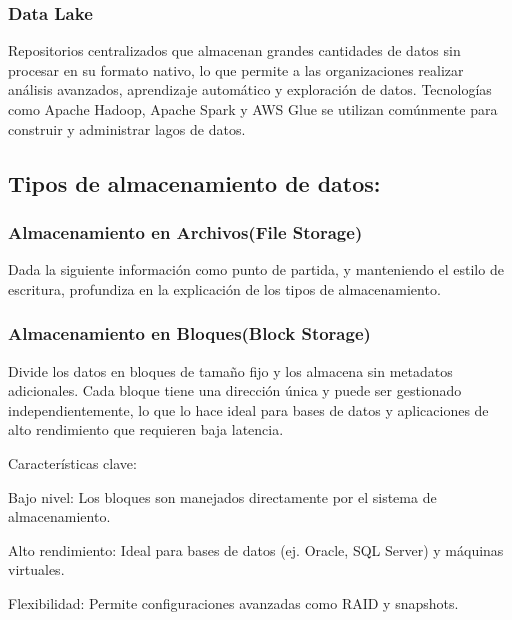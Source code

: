 \documentclass[12pt]{book}
\begin{document}
\subsubsection{Data Lake}
Repositorios centralizados que almacenan grandes cantidades de datos sin procesar en su formato nativo, lo que permite a las organizaciones realizar análisis avanzados, aprendizaje automático y exploración de datos. 
Tecnologías como Apache Hadoop, Apache Spark y AWS Glue se utilizan comúnmente para construir y administrar lagos de datos.

\subsection{Tipos de almacenamiento de datos:} %
\subsubsection{Almacenamiento en Archivos(File Storage)}
Dada la siguiente información como punto de partida, y manteniendo el estilo de escritura, profundiza en la explicación de los tipos de almacenamiento.
\subsubsection{Almacenamiento en Bloques(Block Storage)}
Divide los datos en bloques de tamaño fijo y los almacena sin metadatos adicionales. Cada bloque tiene una dirección única y puede ser gestionado independientemente, lo que lo hace ideal para bases de datos y aplicaciones de alto rendimiento que requieren baja latencia.

Características clave:

Bajo nivel: Los bloques son manejados directamente por el sistema de almacenamiento.

Alto rendimiento: Ideal para bases de datos (ej. Oracle, SQL Server) y máquinas virtuales.

Flexibilidad: Permite configuraciones avanzadas como RAID y snapshots.
\end{document}
